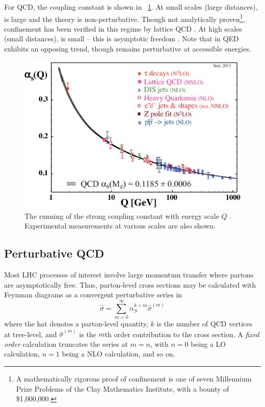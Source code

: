 For \ac{QCD}, the coupling constant \alphaS is shown in \Figure~\ref{fig:alpha_s}. At 
small scales (large distances), \alphaS is large and the theory is non-perturbative. 
Though not analytically proven\footnote{
	A mathematically rigorous proof of confinement is one of seven Millennium Prize 
	Problems of the Clay Mathematics Institute, with a bounty of \$1,000,000.
}, confinement has been verified in this regime by lattice \ac{QCD} \cite{Wilson:1974}. 
At high scales (small distances), \alphaS is small -- this is asymptotic freedom 
\cite{Gross:1973,Politzer:1973}. Note that \alphaEM in \acs{QED} exhibits an opposing 
trend, though remains perturbative at accessible energies.
\begin{figure}
	\includegraphics[width=\mediumfigwidth]{tex/tools/alpha_s}
	\caption{The running of the strong coupling constant \alphaS with energy scale $Q$ 
	\cite{PDG:2012}. Experimental measurements at various scales are also shown.}
	\label{fig:alpha_s}
\end{figure}



\subsection{Perturbative QCD}
\label{sec:qcd:pqcd}

Most \acs{LHC} processes of interest involve large momentum transfer where partons are 
asymptotically free. Thus, parton-level cross sections may be calculated with Feynman 
diagrams as a convergent perturbative series in \alphaS
\begin{equation}
	\hat{\sigma} = \sum\limits_{m=0}^{\infty} \alpha_S^{k+m} \hat{\sigma}^{(m)}
	\label{eq:qcd:partonic_xs}
\end{equation}
where the hat denotes a parton-level quantity, $k$ is the number of \ac{QCD} vertices at 
tree-level, and $\hat{\sigma}^{(m)}$ is the $m$th order contribution to the cross section.
A \textit{fixed order} calculation truncates the series at $m=n$, with $n=0$ being a 
\ac{LO} calculation, $n=1$ being a \ac{NLO} calculation, and so on.

